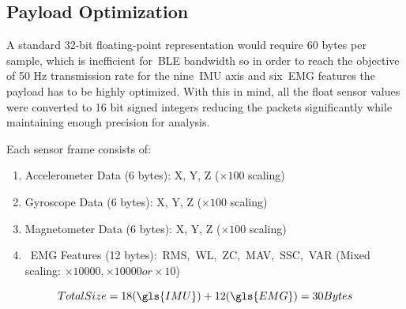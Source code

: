 \subsection{Payload Optimization}
\label{ssec:arduino_payload}

 A standard 32-bit floating-point representation would require 60 bytes per sample, which is inefficient for~\gls{BLE} bandwidth so in order to reach the objective of 50 Hz transmission rate for the nine~\gls{IMU} axis and six~\gls{EMG} features the 
 payload has to be highly optimized. With this in mind, all the float sensor values were converted to 16 bit signed integers reducing the packets significantly while maintaining enough precision for analysis.

 Each sensor frame consists of:

\begin{enumerate}
  \item Accelerometer Data (6 bytes): X, Y, Z ($\times100$ scaling)
  \item Gyroscope Data (6 bytes): X, Y, Z ($\times100$ scaling)
  \item Magnetometer Data (6 bytes): X, Y, Z ($\times100$ scaling)
  \item~\gls{EMG} Features (12 bytes):~\gls{RMS},~\gls{WL},~\gls{ZC},~\gls{MAV},~\gls{SSC},~\gls{VAR} (Mixed scaling: $\times10000, \times10000  or \times10$)
\end{enumerate}

\begin{equation}
  Total Size = 18 (\gls{IMU}) + 12 (\gls{EMG}) = 30 Bytes
  \label{eq:packetSize}
\end{equation}

